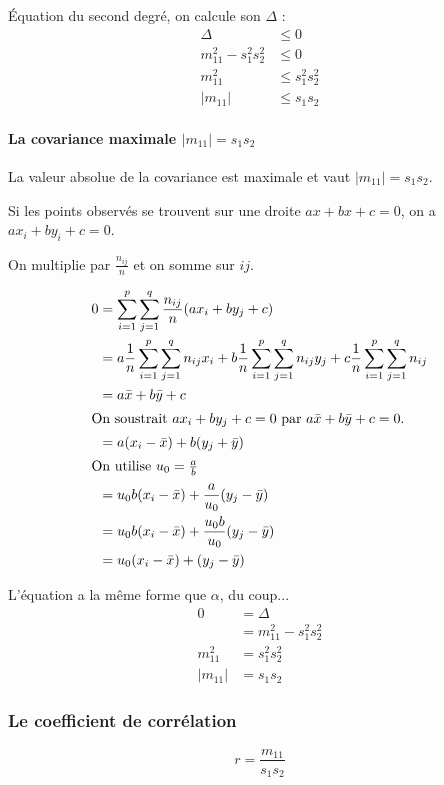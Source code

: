 Équation du second degré, on calcule son $\Delta$ :
\begin{align*}
\Delta &\leq 0\\
m_{11}^2-s_1^2s_2^2 &\leq 0\\
m_{11}^2 &\leq s_1^2s_2^2\\
|m_{11}| &\leq s_1s_2
\end{align*}





\paragraph{La covariance maximale $|m_{11}| = s_1s_2$}

La valeur absolue de la covariance est maximale et vaut $|m_{11}| = s_1s_2$.

Si les points observés se trouvent sur une droite $ax+bx+c=0$, on a $ax_i+by_i+c=0$.

On multiplie par $\frac{n_{ij}}{n}$ et on somme sur $ij$.

\begin{align*}
0  &= \sum_{i=1}^{p} \sum_{j=1}^{q} \frac{n_{ij}}{n}(ax_i+by_j+c) \\
   &= a \frac{1}{n} \sum_{i=1}^{p} \sum_{j=1}^{q}n_{ij}x_i + b \frac{1}{n} \sum_{i=1}^{p} \sum_{j=1}^{q}n_{ij}y_j + c \frac{1}{n} \sum_{i=1}^{p} \sum_{j=1}^{q}n_{ij}\\
   &= a\bar{x}+b\bar{y}+c\\
\intertext{On soustrait $ax_i+by_j+c=0$ par $a\bar{x}+b\bar{y}+c = 0$.}
   &= a(x_i-\bar{x})+b(y_j+\bar{y})\\
\intertext{On utilise $u_0=\frac{a}{b}$}
   &= u_0b(x_i-\bar{x})+\frac{a}{u_0}(y_j-\bar{y})\\
   &= u_0b(x_i-\bar{x})+\frac{u_0b}{u_0}(y_j-\bar{y})\\
   &= u_0(x_i-\bar{x})+(y_j-\bar{y})
\end{align*}

L'équation a la même forme que $\alpha$, du coup...
\begin{align*}
0  &= \Delta\\
        &= m_{11}^2-s_1^2s_2^2\\
m_{11}^2 &= s_1^2s_2^2\\
|m_{11}| &= s_1s_2
\end{align*}




\subsubsection{Le coefficient de corrélation}
$$r=\frac{m_{11}}{s_1s_2}$$






